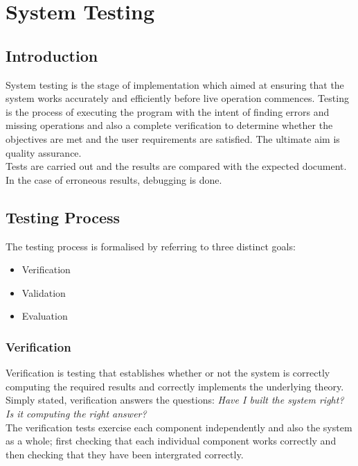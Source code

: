 \documentclass[twoside, a4paper, 12pt]{report}
\begin{document}
\chapter{System Testing}
\section{Introduction}
System testing is the stage of implementation which aimed at ensuring that the system works accurately and efficiently before live operation commences. Testing is the process of executing the program with the intent of finding errors and missing operations and also a complete verification to determine whether the objectives are met and the user requirements are satisfied. The ultimate aim is quality assurance.\\
\indent
Tests are carried out and the results are compared with the expected document. In the case of erroneous results, debugging is done.

\section{Testing Process}
The testing process is formalised by referring to three distinct goals:
\begin{itemize}
	\item Verification
	\item Validation
	\item Evaluation
\end{itemize}

\subsection{Verification}
Verification is testing that establishes whether or not the system is correctly computing the required results and correctly implements the underlying theory. Simply stated, verification answers the questions: \emph{Have I built the system right? Is it computing the right answer?}\\
\indent
The verification tests exercise each component independently and also the system as a whole; first checking that each individual component works correctly and then checking that they have been intergrated correctly.
\end{document}
